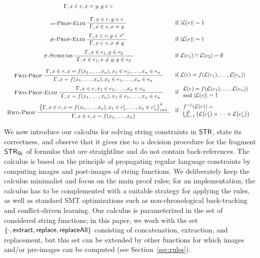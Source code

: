 \begin{table}
\begin{gather*}
\begin{array}{cl}
      {\seqq{x \in e, x = y, y \in e}}
      \\[3ex]
      \infer[$=$-Prop-Elim]
      {\seqq{x \in e, x = y}}
      {\seqq{x \in e, y \in e}}
      &
        \text{if~} |\lang{e}| = 1
      \\[3ex]
      \infer[$\not=$-Prop-Elim]
      {\seqq{x \in e, x \not= y}}
      {\seqq{x \in e, y \in e^c}}
      &
        \text{if~} |\lang{e}| = 1
      \\[3ex]
      \infer[$\not=$-Subsume]
      {\seqq{x \in e_1, x \not= y, y \in e_2}}
      {\seqq{x \in e_1, y \in e_2}}
      &
        \text{if~} \lang{e_1} \cap \lang{e_2} = \emptyset
      \\[4ex]
      \infer[Fwd-Prop]
      {\seqq{x = f(x_1, \ldots, x_n), x_1 \in e_1, \ldots, x_n \in e_n}}
      {\seqq{x \in e, x = f(x_1, \ldots, x_n), x_1 \in e_1, \ldots, x_n \in e_n}}
      &
        \text{if~} \lang{e} = f(\lang{e_1}, \ldots, \lang{e_n})
      \\[3ex]
      \infer[Fwd-Prop-Elim]
      {\seqq{x = f(x_1, \ldots, x_n), x_1 \in e_1, \ldots, x_n \in e_n}}
      {\seqq{x \in e, x_1 \in e_1, \ldots, x_n \in e_n}}
      &
        \text{if~}
        \begin{array}{l}
          \lang{e} = f(\lang{e_1}, \ldots, \lang{e_n})
          \\
          \text{and~} 
          |\lang{e}|= 1
          \end{array}
      \\[3ex]
      \infer[Bwd-Prop]
      {\seqq{x \in e, x = f(x_1, \ldots, x_n)}}
      {\big\{\seqq{x \in e, x = f(x_1, \ldots, x_n),
      x_1 \in e_1^i, \ldots, x_n \in e_n^i}\big\}_{i=1}^k}
      &
        \text{if~}
        \begin{array}{l}
          f^{-1}(\lang{e}) = \\
          \bigcup_{i=1}^k \big( \lang{e_1^i} \times \cdots \times \lang{e_n^i} \big)
          \end{array}
    \end{array}
  \end{gather*}
\end{table}

We now introduce our calculus for solving string constraints in
$\mathsf{STR}$, state its correctness, and observe that it gives rise to a
decision procedure for the fragment $\mathsf{STR}_{\mathsf{SL}}$ of formulas that are
straightline and do not contain back-references. The calculus is based
on the principle of propagating regular language constraints by
computing images and post-images of string functions. We deliberately
keep the calculus minimalist and focus on the main proof rules; for an
implementation, the calculus has to be complemented with a suitable
strategy for applying the rules, as well as standard SMT optimizations
such as non-chronological back-tracking and conflict-driven learning.
%
Our calculus is parameterized in the set of considered string
functions; in this paper, we work with the set
$\{\cdot, \mathsf{extract}, \mathsf{replace}, \mathsf{replaceAll}\}$ consisting of
concatenation, extraction, and replacement, but this set can be
extended by other functions for which images and/or pre-images can be
computed (see Section~\ref{sec:rules}).

